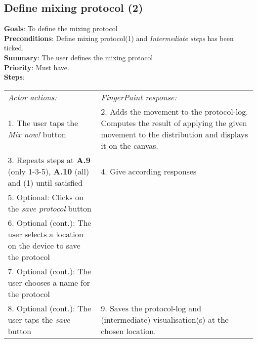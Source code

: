 \begin{appendices}
  \section{Define mixing protocol (2)}
  \textbf{Goals}: To define the mixing protocol\\
  \textbf{Preconditions}: Define mixing protocol(1) and \emph{Intermediate steps} has been ticked.\\
  \textbf{Summary}: The user defines the mixing protocol\\
  \textbf{Priority}: Must have.\\
  \textbf{Steps}: \\
  \begin{tabular}{ p{} p{} }
  	\emph{Actor actions:} & \emph{FingerPaint response:} \\
    1. The user taps the \emph{Mix now!} button & 2.	Adds the movement to the protocol-log. Computes the result of applying the given movement to the distribution and displays it on the canvas.\\
    3.	Repeats steps at \textbf{A.9} (only 1-3-5), \textbf{A.10} (all) and (1) until satisfied & 4.	Give according responses\\
    5. Optional: Clicks on the \emph{save protocol} button & \\
    6. Optional (cont.): The user selects a location on the device to save the protocol & \\
    7. Optional (cont.): The user chooses a name for the protocol & \\
    8. Optional (cont.): The user taps the \emph{save} button & 9. Saves the protocol-log and (intermediate) visualisation(s) at the chosen location. \\

  \end{tabular}


\end{appendices}
